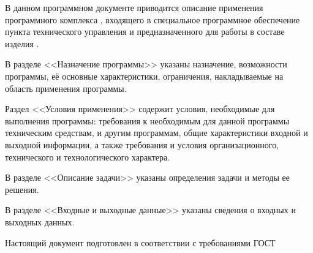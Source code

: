 \newpage\annotation

В данном программном документе приводится описание применения программного комплекса \programname, входящего в специальное программное обеспечение пункта технического управления и предназначенного для работы в составе изделия \productname.

В разделе <<Назначение программы>> указаны назначение, возможности программы, её основные характеристики, ограничения, накладываемые на область применения программы.

Раздел <<Условия применения>> содержит условия, необходимые для выполнения программы: требования к необходимым для данной программы техническим средствам, и другим программам, общие характеристики входной и выходной информации, а также требования и условия организационного, технического и технологического характера.

В разделе <<Описание задачи>> указаны определения задачи и методы ее решения.

В разделе <<Входные и выходные данные>> указаны сведения о входных и выходных данных.

Настоящий документ подготовлен в соответствии с требованиями ГОСТ~\cite{gost19502}

